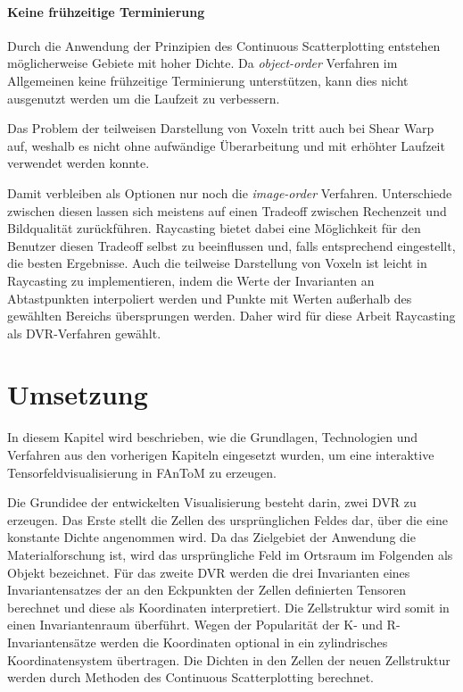 \documentclass[a4paper,fontsize=12pt,toc=bib,parskip=half,ngerman]{scrartcl}
\begin{document}
\paragraph{Keine fr\"uhzeitige Terminierung} Durch die Anwendung der Prinzipien des Continuous Scatterplotting entstehen m\"oglicherweise Gebiete mit hoher Dichte. Da \textit{object-order} Verfahren im Allgemeinen keine fr\"uhzeitige Terminierung unterst\"utzen, kann dies nicht ausgenutzt werden um die Laufzeit zu verbessern.

Das Problem der teilweisen Darstellung von Voxeln tritt auch bei Shear Warp auf, weshalb es nicht ohne aufw\"andige \"Uberarbeitung und mit erh\"ohter Laufzeit verwendet werden konnte.

Damit verbleiben als Optionen nur noch die \textit{image-order} Verfahren. Unterschiede zwischen diesen lassen sich meistens auf einen Tradeoff zwischen Rechenzeit und Bildqualit\"at zur\"uckf\"uhren. Raycasting bietet dabei eine M\"oglichkeit f\"ur den Benutzer diesen Tradeoff selbst zu beeinflussen und, falls entsprechend eingestellt, die besten Ergebnisse. Auch die teilweise Darstellung von Voxeln ist leicht in Raycasting zu implementieren, indem die Werte der Invarianten an Abtastpunkten interpoliert werden und Punkte mit Werten au{\ss}erhalb des gew\"ahlten Bereichs \"ubersprungen werden. Daher wird f\"ur diese Arbeit Raycasting als DVR-Verfahren gew\"ahlt.



\section{Umsetzung}
\label{sec:Umsetzung}
In diesem Kapitel wird beschrieben, wie die Grundlagen, Technologien und Verfahren aus den vorherigen Kapiteln eingesetzt wurden, um eine interaktive Tensorfeldvisualisierung in FAnToM zu erzeugen.

Die Grundidee der entwickelten Visualisierung besteht darin, zwei DVR zu erzeugen. Das Erste stellt die Zellen des urspr\"unglichen Feldes dar, \"uber die eine konstante Dichte angenommen wird. Da das Zielgebiet der Anwendung die Materialforschung ist, wird das urspr\"ungliche Feld im Ortsraum im Folgenden als \glq Objekt\grq{} bezeichnet. F\"ur das zweite DVR werden die drei Invarianten eines Invariantensatzes der an den Eckpunkten der Zellen definierten Tensoren berechnet und diese als Koordinaten interpretiert. Die Zellstruktur wird somit in einen \glq Invariantenraum\grq{} \"uberf\"uhrt. Wegen der Popularit\"at der K- und R-Invariantens\"atze werden die Koordinaten optional in ein zylindrisches Koordinatensystem \"ubertragen. Die Dichten in den Zellen der neuen Zellstruktur werden durch Methoden des Continuous Scatterplotting berechnet.
\end{document}
